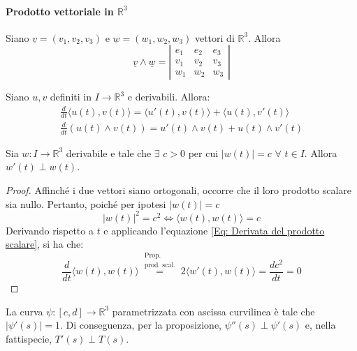 \paragraph*{Prodotto vettoriale in $\mathbb{R}^3$}
Siano $\underline{v}=(v_1, v_2, v_3)$ e $\underline{w}=(w_1, w_2, w_3)$ vettori di $\mathbb{R}^3$. Allora
\begin{equation}
    \underline{v} \wedge \underline{w}=
    \left\lvert\begin{matrix}
         e_1 & e_2 & e_3 \\
               v_1 & v_2 & v_3 \\
               w_1 & w_2 & w_3
            \end{matrix}\right\rvert
\end{equation}
\begin{lemma}
    Siano $u, v$ definiti in $I\to\mathbb{R}^3$ e derivabili. Allora:
    \begin{align}
        \frac{d}{dt}{\langle u(t), v(t) \rangle} = \langle u'(t), v(t) \rangle + \langle u(t), v'(t) \rangle \label{Eq: Derivata del prodotto scalare}\\
        \frac{d}{dt}\left(u(t) \wedge v(t)\right) = u'(t) \wedge v(t) + u(t) \wedge v'(t) \label{Eq: Derivata del prodotto vettoriale}
    \end{align}
\end{lemma}
\begin{proposition}
    Sia $w:I\to\mathbb{R}^3$ derivabile e tale che $\exists$ $c>0$ per cui $|w(t)|=c$ $\forall$ $t \in I$. Allora $w'(t) \perp w(t)$.
\end{proposition}
    \begin{proof}
        Affinché i due vettori siano ortogonali, occorre che il loro prodotto scalare sia nullo. Pertanto, poiché per ipotesi $|w(t)|=c$
        \begin{equation}
            |w(t)|^2=c^2 \iff \langle w(t), w(t) \rangle = c
        \end{equation}
        Derivando rispetto a $t$ e applicando l'equazione \eqref{Eq: Derivata del prodotto scalare}, si ha che:
        \begin{equation}
            \frac{d}{dt}{\langle w(t), w(t)\rangle}\overset{\substack{\text{Prop.} \\ \text{prod. scal.} }}{=}2 \langle w'(t), w(t) \rangle = \frac{d c^2}{dt}=0
        \end{equation}
    \end{proof}
\begin{oss}
    La curva $\psi:[c,d] \to \mathbb{R}^3$ parametrizzata con ascissa curvilinea è tale che $|\psi'(s)|=1$. Di conseguenza, per la proposizione, $\psi''(s) \perp \psi'(s)$ e, nella fattispecie, $T'(s) \perp T (s)$.  
\end{oss}
